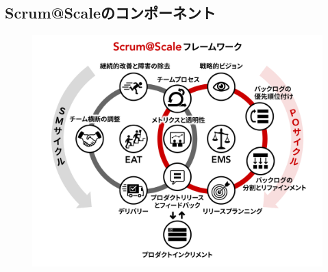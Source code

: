\documentclass[12pt,a4paper,parskip=full]{scrartcl}
\begin{document}

\subsection{Scrum@Scaleのコンポーネント}\label{the-components-of-scrumatscale}
\begin{figure}[H]
    \centering
    \includegraphics[scale=0.25]{SMPO-Cycle-JA.png}
\end{figure}
\end{document}
